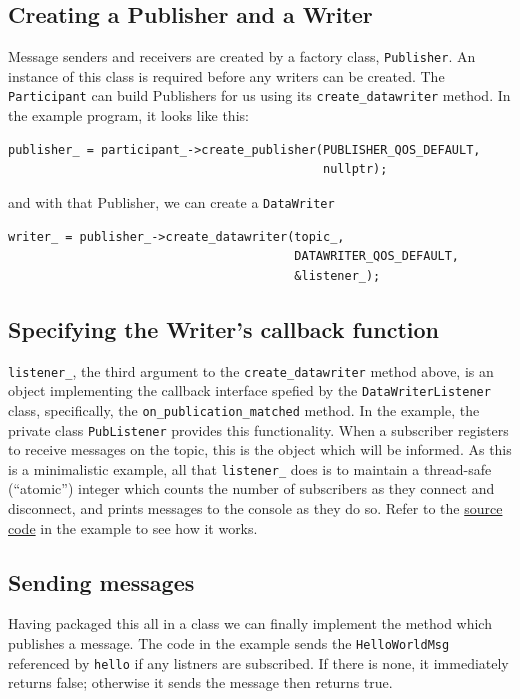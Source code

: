 \documentclass[12pt]{report}
\begin{document}
\subsection{Creating a Publisher and a Writer}

Message senders and receivers  are created by a factory class, \texttt{Publisher}.
An instance of this class is required before any writers can be created.
The \texttt{Participant} can build Publishers for us using its \texttt{create\_datawriter}
method. In the example program, it looks like this:
\begin{verbatim}
publisher_ = participant_->create_publisher(PUBLISHER_QOS_DEFAULT,
                                            nullptr);
\end{verbatim}
and with that Publisher, we can create a \texttt{DataWriter}
\begin{verbatim}
writer_ = publisher_->create_datawriter(topic_,
                                        DATAWRITER_QOS_DEFAULT,
                                        &listener_);
\end{verbatim}

\subsection{Specifying the Writer's callback function}

\texttt{listener\_}, the third argument to the \texttt{create\_datawriter} method
above, is an object implementing the callback interface
spefied by the \texttt{DataWriterListener} class, specifically,
the \texttt{on\_publication\_matched} method. In the example,
the private class \texttt{PubListener} provides this functionality.
When a subscriber registers to receive messages on the topic, this is the object
which will be informed. As this is a minimalistic example, all that
\texttt{listener\_} does is to maintain a thread-safe (``atomic'') integer
which counts the number of subscribers as they connect and disconnect,
and prints messages to the console as they do so. Refer to the
\href{https://github.com/berndporr/fastdds_demo/blob/main/HelloWorldPublisher.cpp#L50}{source code} in the example to see how it works.

\subsection{Sending messages}

Having packaged this all in a class we can finally implement the method
which publishes a message. The code in the example sends the
\texttt{HelloWorldMsg} referenced by \texttt{hello} if any listners are
subscribed. If there is none, it immediately returns false; otherwise
it sends the message then returns true.
\end{document}
